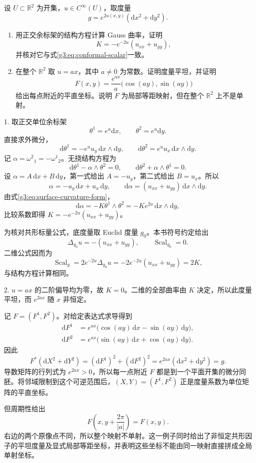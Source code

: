 \begin{exercise}\label{g3:ex:flat-nonconstant-conformal-metric}
	设 \(U\subset\mathbb R^2\) 为开集，\(u\in C^\infty(U)\)，取度量
	\[
		g=e^{2u(x,y)}(\mathrm{d}x^2+\mathrm{d}y^2).
	\]
	\begin{enumerate}
		\item 用正交余标架的结构方程计算 Gauss 曲率，证明
		\[
			K=-e^{-2u}(u_{xx}+u_{yy}),
		\]
		并核对它与式\eqref{g3:eq:conformal-scalar}一致。
		\item 在整个 \(\mathbb R^2\) 取 \(u=ax\)，其中 \(a\ne0\) 为常数。证明度量平坦，并证明
		\[
			F(x,y)=\frac{e^{ax}}{a}\bigl(\cos(ay),\sin(ay)\bigr)
		\]
		给出每点附近的平直坐标。说明 \(F\) 为局部等距映射，但在整个 \(\mathbb R^2\) 上不是单射。
	\end{enumerate}
\end{exercise}
\begin{solution}
	1. 取正交单位余标架
	\[
		\theta^1=e^u\mathrm{d}x,\qquad
		\theta^2=e^u\mathrm{d}y.
	\]
	直接求外微分，
	\[
		\mathrm{d}\theta^1=-e^uu_y\,\mathrm{d}x\wedge\mathrm{d}y,
		\qquad
		\mathrm{d}\theta^2=e^uu_x\,\mathrm{d}x\wedge\mathrm{d}y.
	\]
	记 \(\alpha=\omega^2{}_1=-\omega^1{}_2\)。无挠结构方程为
	\[
		\mathrm{d}\theta^1-\alpha\wedge\theta^2=0,\qquad
		\mathrm{d}\theta^2+\alpha\wedge\theta^1=0.
	\]
	设 \(\alpha=A\,\mathrm{d}x+B\,\mathrm{d}y\)，第一式给出 \(A=-u_y\)，第二式给出 \(B=u_x\)。所以
	\[
		\alpha=-u_y\,\mathrm{d}x+u_x\,\mathrm{d}y,\qquad
		\mathrm{d}\alpha=(u_{xx}+u_{yy})\,\mathrm{d}x\wedge\mathrm{d}y.
	\]
	由式\eqref{g3:eq:surface-curvature-form}，
	\[
		\mathrm{d}\alpha=-K\theta^1\wedge\theta^2
		=-Ke^{2u}\,\mathrm{d}x\wedge\mathrm{d}y,
	\]
	比较系数即得 \(K=-e^{-2u}(u_{xx}+u_{yy})\)。

	为核对共形标量公式，底度量取 Euclid 度量 \(g_0\)。本书符号约定给出
	\[
		\Delta_{g_0}u=-(u_{xx}+u_{yy}),\qquad
		\operatorname{Scal}_{g_0}=0.
	\]
	二维公式因而为
	\[
		\operatorname{Scal}_g
		=2e^{-2u}\Delta_{g_0}u
		=-2e^{-2u}(u_{xx}+u_{yy})=2K,
	\]
	与结构方程计算相同。

	2. \(u=ax\) 的二阶偏导均为零，故 \(K=0\)。二维的全部曲率由 \(K\) 决定，所以此度量平坦，而 \(e^{2ax}\) 随 \(x\) 非恒定。

	记 \(F=(F^1,F^2)\)。对给定表达式求导得到
	\[
		\begin{aligned}
			\mathrm{d}F^1
			&=e^{ax}\bigl(\cos(ay)\,\mathrm{d}x-\sin(ay)\,\mathrm{d}y\bigr),\\
			\mathrm{d}F^2
			&=e^{ax}\bigl(\sin(ay)\,\mathrm{d}x+\cos(ay)\,\mathrm{d}y\bigr).
		\end{aligned}
	\]
	因此
	\[
		F^*(\mathrm{d}X^2+\mathrm{d}Y^2)
		=(\mathrm{d}F^1)^2+(\mathrm{d}F^2)^2
		=e^{2ax}(\mathrm{d}x^2+\mathrm{d}y^2)=g.
	\]
	导数矩阵的行列式为 \(e^{2ax}>0\)，所以每一点附近 \(F\) 都是到一个平面开集的微分同胚。将邻域限制到这个可逆范围后，\((X,Y)=(F^1,F^2)\) 正是度量系数为单位矩阵的平直坐标。

	但周期性给出
	\[
		F\left(x,y+\frac{2\pi}{|a|}\right)=F(x,y).
	\]
	右边的两个原像点不同，所以整个映射不单射。这一例子同时给出了非恒定共形因子的平坦度量及显式局部等距坐标，并表明这些坐标不能由同一映射直接拼成全局单射坐标。
\end{solution}

